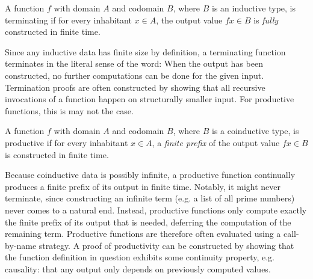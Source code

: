 \begin{definition}
\label{def:terminating_function}
  A function $f$ with domain $A$ and codomain $B$, where $B$ is an inductive
  type, is terminating if for every inhabitant $x\in A$, the output value
  $f x\in B$ is \emph{fully} constructed in finite time.
\end{definition}

Since any inductive data has finite size by definition, a terminating function
terminates in the literal sense of the word: When the output has been
constructed, no further computations can be done for the given
input. Termination proofs are often constructed by showing that all recursive
invocations of a function happen on structurally smaller input. For
productive functions, this is may not the case.

\begin{definition}
\label{def:productive_function}
  A function $f$ with domain $A$ and codomain $B$, where $B$ is a coinductive
  type, is productive if for every inhabitant $x\in A$, a \emph{finite prefix}
  of the output value $f x\in B$ is constructed in finite time.
\end{definition}

Because coinductive data is possibly infinite, a productive function continually
produces a finite prefix of its output in finite time. Notably, it might never
terminate, since constructing an infinite term (e.g. a list of all prime
numbers) never comes to a natural end. Instead, productive functions only
compute exactly the finite prefix of its output that is needed, deferring the
computation of the remaining term. Productive functions are therefore often
evaluated using a call-by-name strategy. A proof of productivity can be
constructed by showing that the function definition in question exhibits some
continuity property, e.g. causality: that any output only depends on previously
computed values.

